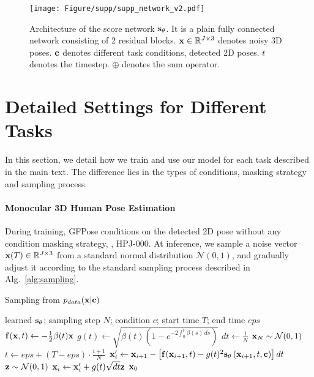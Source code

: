 \documentclass[10pt,twocolumn,letterpaper]{article}
\begin{document}
\begin{figure*}[!t]
    \centering
    \texttt{[image: Figure/supp/supp\_network\_v2.pdf]}
\caption{Architecture of the score network $\mathbf{s}_{\theta}$. It is a plain fully connected network consisting of 2 residual blocks.  $\mathbf{x} \in \mathbb{R}^{J \times 3}$ denotes noisy 3D poses. $\mathbf{c}$ denotes different task conditions, \eg detected 2D poses. $t$ denotes the timestep. $\oplus$ denotes the sum operator.  }
    \label{fig:supp_network}
\end{figure*}

\section{Detailed Settings for Different Tasks}
\label{sec:supp_task}
In this section, we detail how we train and use our model for each task described in the main text. The difference lies in the types of conditions, masking strategy and sampling process. 




\paragraph{Monocular 3D Human Pose Estimation}
During training, GFPose conditions on the detected 2D pose without any condition masking strategy, \ie, HPJ-000. At inference, we sample a noise vector $\mathbf{x}(T) \in \mathbb{R}^{J \times 3}$ from a standard normal distribution $\mathcal{N} (0, 1)$, and gradually adjust it according to the standard sampling process described in Alg.~\ref{alg:sampling}.

\begin{algorithm}[t]
\caption{Sampling from $p_{data}(\mathbf{x}|\mathbf{c})$}
\label{alg:sampling}
\begin{algorithmic}[1]
\Require learned $\mathbf{s}_{\theta}$; sampling step $N$; condition $c$; start time $T$; end time $eps$
\State $\mathbf{f}(\mathbf{x}, t) \gets - \frac{1}{2} \beta(t) \mathbf{x}$
\State $g(t) \gets \sqrt{ \beta (t) ( 1 -  e^{-2  \int_{0}^{t} \beta (s) \, ds } ) }$
\State $dt \gets \frac{1}{N}$
\State $\mathbf{x}_N \sim \mathcal{N}(0, 1)$
    \State $t \gets eps + (T - eps) \cdot \frac{i+1}{N} $
    \State $\mathbf{x}_{i}' \gets \mathbf{x}_{i+1} - \left[ \mathbf{f}(\mathbf{x}_{i+1}, t) - g(t)^2 \mathbf{s}_{\theta} \left( \mathbf{x}_{i+1}, t, \mathbf{c} \right) \right] dt$
    \State $\mathbf{z} \sim \mathcal{N}(0, 1)$
    \State $\mathbf{x}_{i} \gets \mathbf{x}_{i}' + g(t) \sqrt{dt} \mathbf{z}$
\EndFor
\State \Return $\mathbf{x}_{0}$
\end{algorithmic}
\end{algorithm}
\end{document}
